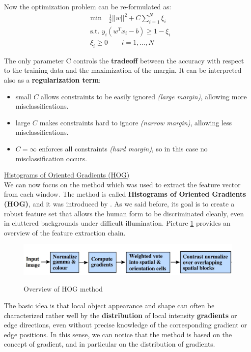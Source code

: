 Now the optimization problem can be re-formulated as:
\begin{equation*}
\begin{aligned}
&\text{min} \quad \frac{1}{2}||w||^2+ C\sum\limits_{i = 1}^N\xi_i\\
&\text{s.t. } y_i(w^Tx_i-b)\geq 1 - \xi_i\\
&\xi_i \geq 0 \qquad i = 1,\dots,N
\end{aligned}
\end{equation*}

The only parameter C controls the \textbf{tradeoff} between the accuracy with respect to the training data and the maximization of the margin. It can be interpreted also as a \textbf{regularization term}:

\begin{itemize}
	\item small $C$ allows constraints to be easily ignored \textit{(large margin)}, allowing more misclassifications.
	\item large $C$ makes constraints hard to ignore \textit{(narrow margin)}, allowing less misclassifications.
	\item $C = \infty$ enforces all constraints \textit{(hard margin)}, so in this case no misclassification occurs.
\end{itemize}

\underline{Histograms of Oriented Gradients (HOG)}
\\

We can now focus on the method which was used to extract the feature vector from each window. The method is called \textbf{Histograms of Oriented Gradients (HOG)}, and it was introduced by \cite{dalal2005histograms}. As we said before, its goal is to create a robust feature set that allows the human form to be discriminated cleanly, even in cluttered backgrounds under difficult illumination. Picture \ref{hog} provides an overview of the feature extraction chain.

\begin{figure}[h!]
		\centering
		\includegraphics[scale = 1.2]{img/hog.jpg}
        \label{hog}
        \caption{Overview of HOG method}
\end{figure}

The basic idea is that local object appearance and shape can often be characterized rather well by the \textbf{distribution} of local intensity \textbf{gradients} or edge directions, even without precise knowledge of the corresponding gradient or edge positions. In this sense, we can notice that the method is based on the concept of gradient, and in particular on the distribution of gradients.

